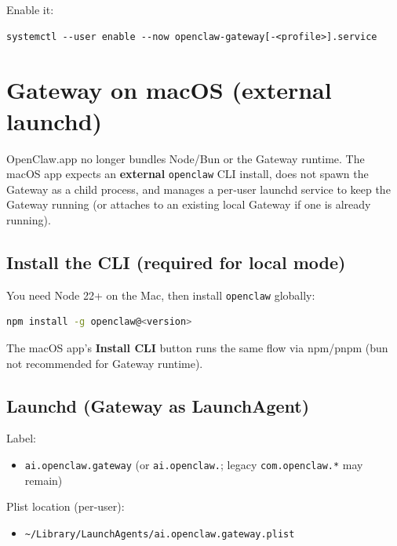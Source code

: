 Enable it:

\begin{lstlisting}
systemctl --user enable --now openclaw-gateway[-<profile>].service
\end{lstlisting}



\clearpage

\section{Gateway on macOS (external launchd)}


OpenClaw.app no longer bundles Node/Bun or the Gateway runtime. The macOS app
expects an \textbf{external} \texttt{openclaw} CLI install, does not spawn the Gateway as a
child process, and manages a per‑user launchd service to keep the Gateway
running (or attaches to an existing local Gateway if one is already running).

\subsection{Install the CLI (required for local mode)}


You need Node 22+ on the Mac, then install \texttt{openclaw} globally:

\begin{lstlisting}[language=bash]
npm install -g openclaw@<version>
\end{lstlisting}


The macOS app’s \textbf{Install CLI} button runs the same flow via npm/pnpm (bun not recommended for Gateway runtime).

\subsection{Launchd (Gateway as LaunchAgent)}


Label:

\begin{itemize}
  \item \texttt{ai.openclaw.gateway} (or \texttt{ai.openclaw.}; legacy \texttt{com.openclaw.*} may remain)
\end{itemize}


Plist location (per‑user):

\begin{itemize}
  \item \texttt{\textasciitilde{}/Library/LaunchAgents/ai.openclaw.gateway.plist}
\end{itemize}

